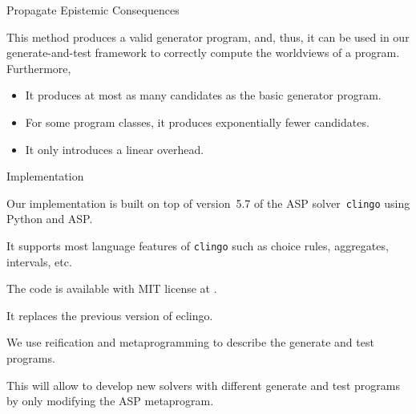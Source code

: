 \documentclass[aspectratio=169,svgnames,xcolor=table,t]{beamer}
\begin{document}
\begin{frame}[c]{Propagate Epistemic Consequences}
    \begin{theorem}
        This method produces a valid generator program, and, thus, it can be used in our generate-and-test framework to correctly compute the worldviews of a program.
        \\
        Furthermore,
        \begin{itemize}
            \item It produces at most as many candidates as the basic generator program.
            \item For some program classes, it produces exponentially fewer candidates.
            \item It only introduces a linear overhead.
        \end{itemize}
    \end{theorem}
\end{frame}
\begin{frame}[c]{Implementation}
    \begin{myitemize}
        \item[] Our implementation is built on top of version~5.7 of the ASP solver~\texttt{clingo} using Python and ASP.%
        \begin{myitemize}
            \item It supports most language features of \texttt{clingo} such as choice rules, aggregates, intervals, etc.
            
            \item The code is available with MIT license at .
            
            \item It replaces the previous version of eclingo.
                        
            \item We use reification and metaprogramming to describe the generate and test programs.
            
            \item This will allow to develop new solvers with different generate and test programs by only modifying the ASP metaprogram.
        \end{myitemize}
    \end{myitemize}
\end{frame}
\end{document}
